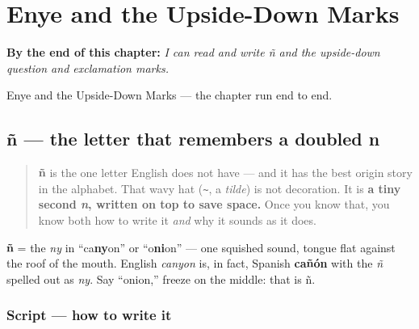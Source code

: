 
\chapter{Enye and the Upside-Down Marks}
\label{ch:enye-and-marks}

\begin{chapteropening}
\textbf{By the end of this chapter:} \emph{I can read and write ñ and the upside-down question and exclamation marks.}

Enye and the Upside-Down Marks — the chapter run end to end.
\end{chapteropening}

\section[ñ]{ñ — the letter that remembers a doubled n}

\label{lesson:ES-W02-enye}



\begin{quote}
\textbf{ñ} is the one letter English does not have — and it has the best origin story in the alphabet. That wavy hat (\texttt{\textasciitilde{}}, a \emph{tilde}) is not decoration. It is \textbf{a tiny second \emph{n}, written on top to save space.} Once you know that, you know both how to write it \emph{and} why it sounds as it does.
\end{quote}

\begin{sounds}
\textbf{ñ} = the \emph{ny} in \textquotedblleft{}ca\textbf{ny}on\textquotedblright{} or \textquotedblleft{}o\textbf{ni}on\textquotedblright{} — one squished sound, tongue flat against the roof of the mouth. English \emph{canyon} is, in fact, Spanish \textbf{cañón} with the \emph{ñ} spelled out as \emph{ny}. Say \textquotedblleft{}onion,\textquotedblright{} freeze on the middle: that is ñ.
\end{sounds}

\subsection*{Script — how to write it}

